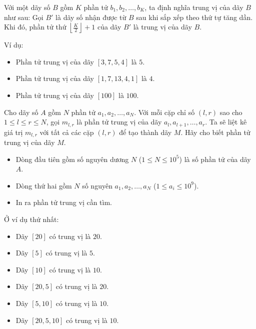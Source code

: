 \documentclass[12pt,a4paper,oneside]{article}
\begin{document}

\renewcommand{\baselinestretch}{1.25}
\setlength{\parskip}{1em}

Với một dãy số $B$ gồm $K$ phần tử $b_1, b_2, \ldots, b_K$, ta định nghĩa trung vị của dãy $B$ như sau: Gọi $B'$ là dãy số nhận được từ $B$ sau khi sắp xếp theo thứ tự tăng dần. Khi đó, phần tử thứ $\left \lfloor \frac{K}{2} \right \rfloor + 1$ của dãy $B'$ là trung vị của dãy $B$.

Ví dụ:
\begin{itemize}
\item Phần tử trung vị của dãy $[3, 7, 5, 4]$ là $5$.
\item Phần tử trung vị của dãy $[1, 7, 13, 4, 1]$ là $4$.
\item Phần tử trung vị của dãy $[100]$ là $100$.
\end{itemize}

Cho dãy số $A$ gồm $N$ phần tử $a_1, a_2, \ldots, a_N$. Với mỗi cặp chỉ số $(l, r)$ sao cho $1 \le l \le r \le N$, gọi $m_{l, r}$ là phần tử trung vị của dãy $a_l, a_{l+1}, \ldots, a_r$. Ta sẽ liệt kê giá trị $m_{l, r}$ với tất cả các cặp $(l, r)$ để tạo thành dãy $M$. Hãy cho biết phần tử trung vị của dãy $M$.


\setlength{\parskip}{0.25em}

\begin{itemize} 
\item Dòng đầu tiên gồm số nguyên dương $N$ ($1 \le N \le 10^5$) là số phần tử của dãy $A$.
\item Dòng thứ hai gồm $N$ số nguyên $a_1, a_2, \ldots, a_N$ ($1 \le a_i \le 10^9$).
\end{itemize}


\begin{itemize}
\item In ra phần tử trung vị cần tìm.
\end{itemize}


\renewcommand{\baselinestretch}{1.0}
\begin{example}
\end{example}


Ở ví dụ thứ nhất:

\begin{itemize}
\item Dãy $[20]$ có trung vị là $20$.
\item Dãy $[5]$ có trung vị là $5$.
\item Dãy $[10]$ có trung vị là $10$.
\item Dãy $[20, 5]$ có trung vị là $20$.
\item Dãy $[5, 10]$ có trung vị là $10$.
\item Dãy $[20, 5, 10]$ có trung vị là $10$.
\end{itemize}
\end{document}

